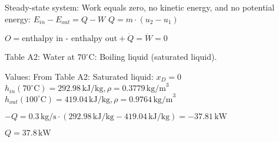 Steady-state system: Work equals zero, no kinetic energy, and no potential energy:  
\( E_{in} - E_{out} = Q - W \)  
\( Q = m \cdot (u_2 - u_1) \)  

\( O = \text{enthalpy in - enthalpy out} + \dot{Q} = \dot{W} = 0 \)  

Table A2:  
Water at \( 70^\circ \text{C} \):  
Boiling liquid (saturated liquid).  

Values:  
From Table A2:  
Saturated liquid: \( x_D = 0 \)  
\( h_{in}(70^\circ \text{C}) = 292.98 \, \text{kJ/kg}, \rho = 0.3779 \, \text{kg/m}^3 \)  
\( h_{out}(100^\circ \text{C}) = 419.04 \, \text{kJ/kg}, \rho = 0.9764 \, \text{kg/m}^3 \)  

\( -Q = 0.3 \, \text{kg/s} \cdot (292.98 \, \text{kJ/kg} - 419.04 \, \text{kJ/kg}) = -37.81 \, \text{kW} \)  

\( Q = 37.8 \, \text{kW} \)